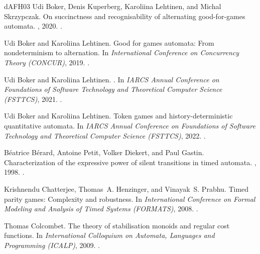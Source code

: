 \documentclass[10pt,a4paper]{amsart}
\theoremstyle{definition}
\numberwithin{equation}{section}
\begin{document}
\begin{thebibliography}{dAFH{\etalchar{+}}03}
Udi Boker, Denis Kuperberg, Karoliina Lehtinen, and Michal Skrzypczak.
\newblock On succinctness and recognisability of alternating good-for-games
  automata.
, 2020.
\newblock \href {http://arxiv.org/abs/2002.07278} {}.

Udi Boker and Karoliina Lehtinen.
\newblock Good for games automata: From nondeterminism to alternation.
\newblock In {\em International Conference on Concurrency Theory (CONCUR)},
  2019.
\newblock \href {https://doi.org/10.4230/LIPIcs.CONCUR.2019.19}
  {}.

Udi Boker and Karoliina Lehtinen.
.
\newblock In {\em IARCS Annual Conference on Foundations of Software Technology
  and Theoretical Computer Science (FSTTCS)}, 2021.
\newblock \href {https://doi.org/10.4230/LIPIcs.FSTTCS.2021.38}
  {}.

Udi Boker and Karoliina Lehtinen.
\newblock Token games and history-deterministic quantitative automata.
\newblock In {\em IARCS Annual Conference on Foundations of Software Technology
  and Theoretical Computer Science (FSTTCS)}, 2022.
\newblock \href {https://doi.org/10.1007/978-3-030-99253-8_7}
  {}.

B\'{e}atrice B\'{e}rard, Antoine Petit, Volker Diekert, and Paul Gastin.
\newblock Characterization of the expressive power of silent transitions in
  timed automata.
, 1998.
\newblock \href {https://doi.org/10.3233/FI-1998-36233}
  {}.

Krishnendu Chatterjee, Thomas~A. Henzinger, and Vinayak~S. Prabhu.
\newblock Timed parity games: Complexity and robustness.
\newblock In {\em International Conference on Formal Modeling and Analysis of
  Timed Systems (FORMATS)}, 2008.
\newblock \href {https://doi.org/10.1007/978-3-540-85778-5_10}
  {}.

Thomas Colcombet.
\newblock The theory of stabilisation monoids and regular cost functions.
\newblock In {\em International Colloquium on Automata, Languages and
  Programming (ICALP)}, 2009.
\newblock \href {https://doi.org/10.1007/978-3-642-02930-1_12}
  {}.


\end{thebibliography}
\end{document}
